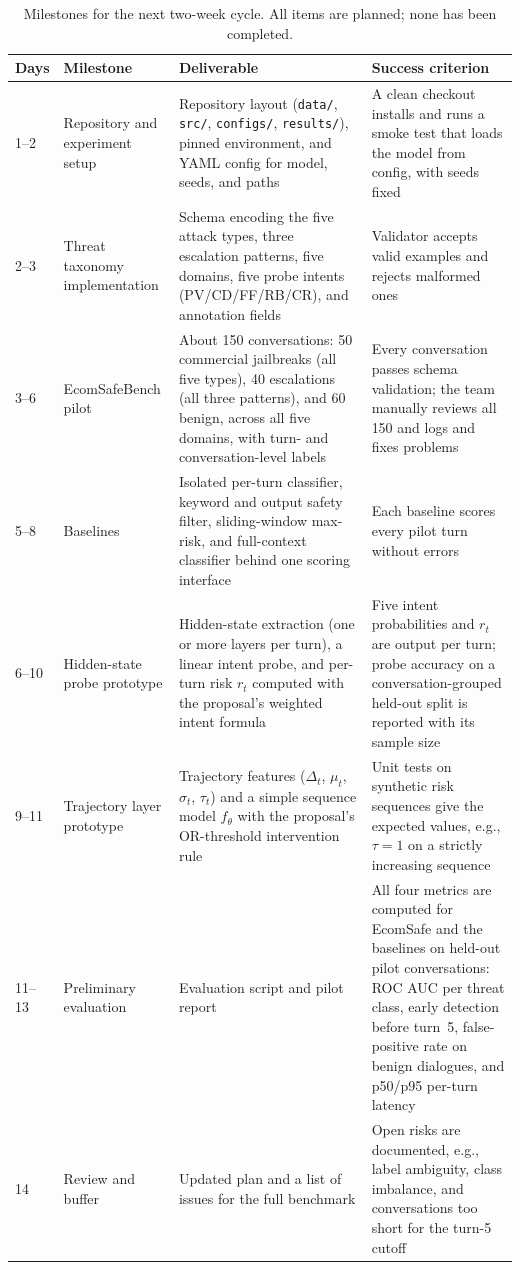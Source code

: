 \documentclass[sigconf]{acmart}
\begin{document}
\begin{table}[t]
  \caption{Milestones for the next two-week cycle. All items are planned; none has been completed.}
  \label{tab:plan}
  \small
  \begin{tabular}{p{0.8cm}p{2.4cm}p{6.0cm}p{6.0cm}}
    \toprule
    \textbf{Days} & \textbf{Milestone} & \textbf{Deliverable} & \textbf{Success criterion} \\
    \midrule
    1--2 & Repository and experiment setup & Repository layout (\texttt{data/}, \texttt{src/}, \texttt{configs/}, \texttt{results/}), pinned environment, and YAML config for model, seeds, and paths & A clean checkout installs and runs a smoke test that loads the model from config, with seeds fixed \\
    2--3 & Threat taxonomy implementation & Schema encoding the five attack types, three escalation patterns, five domains, five probe intents (PV/CD/FF/RB/CR), and annotation fields & Validator accepts valid examples and rejects malformed ones \\
    3--6 & EcomSafeBench pilot & About 150 conversations: 50 commercial jailbreaks (all five types), 40 escalations (all three patterns), and 60 benign, across all five domains, with turn- and conversation-level labels & Every conversation passes schema validation; the team manually reviews all 150 and logs and fixes problems \\
    5--8 & Baselines & Isolated per-turn classifier, keyword and output safety filter, sliding-window max-risk, and full-context classifier behind one scoring interface & Each baseline scores every pilot turn without errors \\
    6--10 & Hidden-state probe prototype & Hidden-state extraction (one or more layers per turn), a linear intent probe, and per-turn risk $r_t$ computed with the proposal's weighted intent formula & Five intent probabilities and $r_t$ are output per turn; probe accuracy on a conversation-grouped held-out split is reported with its sample size \\
    9--11 & Trajectory layer prototype & Trajectory features ($\Delta_t$, $\mu_t$, $\sigma_t$, $\tau_t$) and a simple sequence model $f_\theta$ with the proposal's OR-threshold intervention rule & Unit tests on synthetic risk sequences give the expected values, e.g., $\tau = 1$ on a strictly increasing sequence \\
    11--13 & Preliminary evaluation & Evaluation script and pilot report & All four metrics are computed for EcomSafe and the baselines on held-out pilot conversations: ROC AUC per threat class, early detection before turn~5, false-positive rate on benign dialogues, and p50/p95 per-turn latency \\
    14 & Review and buffer & Updated plan and a list of issues for the full benchmark & Open risks are documented, e.g., label ambiguity, class imbalance, and conversations too short for the turn-5 cutoff \\
    \bottomrule
  \end{tabular}
\end{table}
\end{document}
